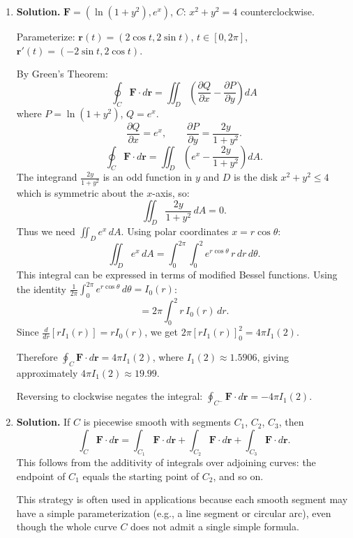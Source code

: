 \begin{enumerate}
\textbf{$C_4$}: $(0,1)\to(0,0)$: $\mathbf{r}=(0,1-t)$, $t\in[0,1]$, $d\mathbf{r}=(0,-1)dt$.
\[
\int_{C_4} = \int_0^1 0\cdot(-1)\,dt = 0.
\]

Total: $2+4+0+0 = \boxed{6}$.

\item \textbf{Solution.}
$\mathbf{F}=(\ln(1+y^2), e^x)$, $C$: $x^2+y^2=4$ counterclockwise.

Parameterize: $\mathbf{r}(t) = (2\cos t, 2\sin t)$, $t\in[0,2\pi]$, $\mathbf{r}'(t)=(-2\sin t, 2\cos t)$.

By Green's Theorem:
\[
\oint_C \mathbf{F}\cdot d\mathbf{r} = \iint_D\left(\frac{\partial Q}{\partial x}-\frac{\partial P}{\partial y}\right)dA
\]
where $P = \ln(1+y^2)$, $Q = e^x$.
\[
\frac{\partial Q}{\partial x} = e^x, \qquad \frac{\partial P}{\partial y} = \frac{2y}{1+y^2}.
\]
\[
\oint_C \mathbf{F}\cdot d\mathbf{r} = \iint_D\left(e^x - \frac{2y}{1+y^2}\right)dA.
\]
The integrand $\frac{2y}{1+y^2}$ is an odd function in $y$ and $D$ is the disk $x^2+y^2\le 4$ which is symmetric about the $x$-axis, so:
\[
\iint_D \frac{2y}{1+y^2}\,dA = 0.
\]
Thus we need $\iint_D e^x\,dA$. Using polar coordinates $x=r\cos\theta$:
\[
\iint_D e^x\,dA = \int_0^{2\pi}\int_0^2 e^{r\cos\theta}\,r\,dr\,d\theta.
\]
This integral can be expressed in terms of modified Bessel functions. Using the identity $\frac{1}{2\pi}\int_0^{2\pi}e^{r\cos\theta}\,d\theta = I_0(r)$:
\[
= 2\pi\int_0^2 r\,I_0(r)\,dr.
\]
Since $\frac{d}{dr}[rI_1(r)] = rI_0(r)$, we get $2\pi[rI_1(r)]_0^2 = 4\pi I_1(2)$.

Therefore $\displaystyle\oint_C \mathbf{F}\cdot d\mathbf{r} = 4\pi I_1(2)$, where $I_1(2) \approx 1.5906$, giving approximately $\boxed{4\pi I_1(2) \approx 19.99}$.

Reversing to clockwise negates the integral: $\displaystyle\oint_{C^-}\mathbf{F}\cdot d\mathbf{r} = -4\pi I_1(2)$.

\item \textbf{Solution.}
If $C$ is piecewise smooth with segments $C_1$, $C_2$, $C_3$, then
\[
\int_C \mathbf{F}\cdot d\mathbf{r} = \int_{C_1}\mathbf{F}\cdot d\mathbf{r} + \int_{C_2}\mathbf{F}\cdot d\mathbf{r} + \int_{C_3}\mathbf{F}\cdot d\mathbf{r}.
\]
This follows from the additivity of integrals over adjoining curves: the endpoint of $C_1$ equals the starting point of $C_2$, and so on.

This strategy is often used in applications because each smooth segment may have a simple parameterization (e.g., a line segment or circular arc), even though the whole curve $C$ does not admit a single simple formula.


\end{enumerate}
